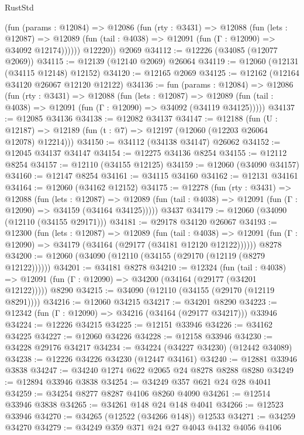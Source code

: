 \begin{lexlean}{RustStd}
\begin{coremodule}
          (fun (params : @12084) =>
          @12086
            (fun (rty : @3431) =>
            @12088
              (fun (lets : @12087) =>
              @12089 (fun (tail : @4038) => @12091 (fun (Γ : @12090) => @34092 @12174))))))
        @12220))
    @2069
@34112 := @12226 (@34085 (@12077 @2069))
@34115 := @12139 (@12140 @2069) @26064
@34119 := @12060 (@12131 (@34115 @12148) @12152)
@34120 := @12165 @2069
@34125 := @12162 (@12164 @34120 @26067 @12120 @12122)
@34136 := fun (params : @12084) =>
  @12086
    (fun (rty : @3431) =>
    @12088
      (fun (lets : @12087) =>
      @12089 (fun (tail : @4038) => @12091 (fun (Γ : @12090) => @34092 (@34119 @34125)))))
@34137 := @12085 @34136
@34138 := @12082 @34137
@34147 := @12188
    (fun (U : @12187) => @12189 (fun (t : @7) => @12197 (@12060 (@12203 @26064 @12078) @12214)))
@34150 := @34112 (@34138 @34147) @26062
@34152 := @12045 @34137 @34147
@34154 := @12275 @34136 @8254
@34155 := @12112 @8254
@34157 := @12110 (@34155 @12125)
@34159 := @12060 (@34090 @34157)
@34160 := @12147 @8254
@34161 := @34115 @34160
@34162 := @12131 @34161
@34164 := @12060 (@34162 @12152)
@34175 := @12278
    (fun (rty : @3431) =>
    @12088
      (fun (lets : @12087) =>
      @12089 (fun (tail : @4038) => @12091 (fun (Γ : @12090) => @34159 (@34164 @34125)))))
    @3437
@34179 := @12060 (@34090 (@12110 (@34155 @29171)))
@34181 := @29178 @34120 @26067
@34193 := @12300
    (fun (lets : @12087) =>
    @12089
      (fun (tail : @4038) =>
      @12091 (fun (Γ : @12090) => @34179 (@34164 (@29177 (@34181 @12120 @12122))))))
    @8278
@34200 := @12060 (@34090 (@12110 (@34155 (@29170 (@12119 (@8279 @12122))))))
@34201 := @34181 @8278
@34210 := @12324
    (fun (tail : @4038) => @12091 (fun (Γ : @12090) => @34200 (@34164 (@29177 (@34201 @12122)))))
    @8290
@34215 := @34090 (@12110 (@34155 (@29170 (@12119 @8291))))
@34216 := @12060 @34215
@34217 := @34201 @8290
@34223 := @12342 (fun (Γ : @12090) => @34216 (@34164 (@29177 @34217))) @33946
@34224 := @12226 @34215
@34225 := @12151 @33946
@34226 := @34162 @34225
@34227 := @12060 @34226
@34228 := @12158 @33946
@34230 := @34228 @29176 @34217
@34234 := @34224 (@34227 @34230) (@12442 @34089)
@34238 := @12226 @34226 @34230 (@12447 @34161)
@34240 := @12881 @33946 @3838
@34247 := @34240 @1274 @622 @2065 @24 @8278 @8288 @8280
@34249 := @12894 @33946 @3838
@34254 := @34249 @357 @621 @24 @28 @4041
@34259 := @34254 @8277 @8287 @4106 @8260 @4090
@34261 := @12514 @33946 @3838
@34265 := @34261 @148 @24 @148 @4041
@34266 := @12523 @33946
@34270 := @34265 (@12522 (@34266 @148)) @12533
@34271 := @34259 @34270
@34279 := @34249 @359 @371 @24 @27 @4043 @4132 @4056 @4106

\end{coremodule}
\end{lexlean}
